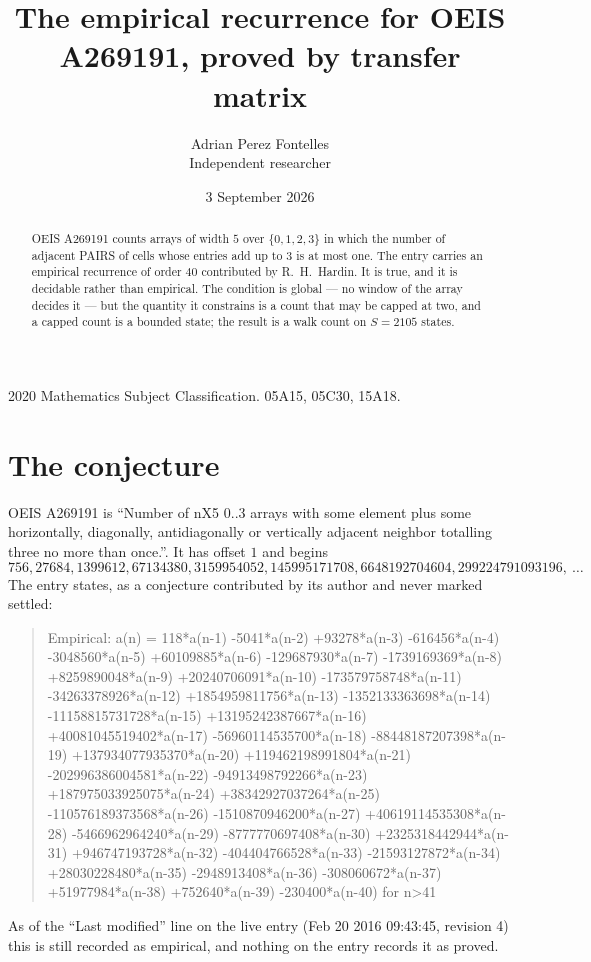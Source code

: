 \documentclass[11pt,a4paper]{article}
\title{The empirical recurrence for OEIS A269191, proved by transfer matrix}
\author{Adrian Perez Fontelles\\ \small Independent researcher}
\date{3 September 2026}
\theoremstyle{plain}
\theoremstyle{definition}
\begin{document}
\maketitle

\begin{abstract}
OEIS A269191 counts arrays of width $5$ over $\{0,1,2,3\}$ in which the number of adjacent PAIRS of
cells whose entries add up to $3$ is at most one. The entry carries an empirical recurrence of
order $40$ contributed by R.~H.~Hardin. It is true, and it is decidable rather than
empirical. The condition is global --- no window of the array decides it --- but the quantity
it constrains is a count that may be capped at two, and a capped count is a bounded state; the
result is a walk count on $S=2105$ states.
\end{abstract}

\noindent\small 2020 Mathematics Subject Classification. 05A15, 05C30, 15A18.\normalsize

\section{The conjecture}

OEIS A269191 is ``Number of nX5 0..3 arrays with some element plus some horizontally, diagonally, antidiagonally or vertically adjacent neighbor totalling three no more than once.''. It has offset $1$ and begins
\[
756, 27684, 1399612, 67134380, 3159954052, 145995171708, 6648192704604, 299224791093196,\ \dots
\]
The entry states, as a conjecture contributed by its author and never marked settled:
\begin{quote}
Empirical: a(n) = 118*a(n-1) -5041*a(n-2) +93278*a(n-3) -616456*a(n-4) -3048560*a(n-5) +60109885*a(n-6) -129687930*a(n-7) -1739169369*a(n-8) +8259890048*a(n-9) +20240706091*a(n-10) -173579758748*a(n-11) -34263378926*a(n-12) +1854959811756*a(n-13) -1352133363698*a(n-14) -11158815731728*a(n-15) +13195242387667*a(n-16) +40081045519402*a(n-17) -56960114535700*a(n-18) -88448187207398*a(n-19) +137934077935370*a(n-20) +119462198991804*a(n-21) -202996386004581*a(n-22) -94913498792266*a(n-23) +187975033925075*a(n-24) +38342927037264*a(n-25) -110576189373568*a(n-26) -1510870946200*a(n-27) +40619114535308*a(n-28) -5466962964240*a(n-29) -8777770697408*a(n-30) +2325318442944*a(n-31) +946747193728*a(n-32) -404404766528*a(n-33) -21593127872*a(n-34) +28030228480*a(n-35) -2948913408*a(n-36) -308060672*a(n-37) +51977984*a(n-38) +752640*a(n-39) -230400*a(n-40) for n>41
\end{quote}
As of the ``Last modified'' line on the live entry (Feb 20 2016 09:43:45, revision 4) this is still
recorded as empirical, and nothing on the entry records it as proved.
\end{document}
